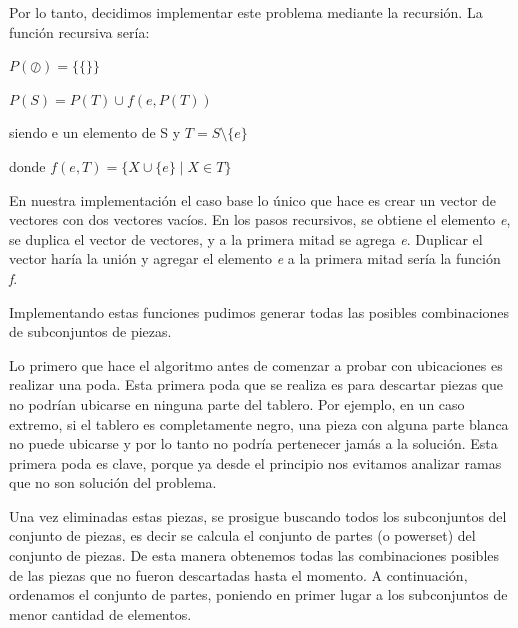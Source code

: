 \quad Por lo tanto, decidimos implementar este problema mediante la recursi\'on. La funci\'on recursiva ser\'ia:

\quad

$ P(\oslash) = \lbrace\lbrace\rbrace\rbrace $

\quad

$ P(S) = P(T) \cup f(e,P(T)) $

\quad

\quad siendo e un elemento de S y $ T = S \setminus \lbrace e \rbrace $

\quad

\quad donde $ f(e,T) = \lbrace X \cup \lbrace e \rbrace \mid X \in T \rbrace $

\quad

\quad En nuestra implementaci\'on el caso base lo \'unico que hace es crear un vector de vectores con dos vectores vac\'ios. En los pasos recursivos, se obtiene el elemento \textit{e}, se duplica el vector de vectores, y a la primera mitad se agrega \textit{e}. Duplicar el vector har\'ia la uni\'on y agregar el elemento \textit{e} a la primera mitad ser\'ia la funci\'on \textit{f}.

\quad Implementando estas funciones pudimos generar todas las posibles combinaciones de subconjuntos de piezas.


\quad Lo primero que hace el algoritmo antes de comenzar a probar con ubicaciones es realizar una poda. Esta primera poda que se realiza es para descartar piezas que no podrían ubicarse en ninguna parte del tablero. Por ejemplo, en un caso extremo, si el tablero es completamente negro, una pieza con alguna parte blanca no puede ubicarse y por lo tanto no podría pertenecer jamás a la solución. Esta primera poda es clave, porque ya desde el principio nos evitamos analizar ramas que no son solución del problema.

\quad Una vez eliminadas estas piezas, se prosigue buscando todos los subconjuntos del conjunto de piezas, es decir se calcula el conjunto de partes (o powerset) del conjunto de piezas. De esta manera obtenemos todas las combinaciones posibles de las piezas que no fueron descartadas hasta el momento. A continuación, ordenamos el conjunto de partes, poniendo en primer lugar a los subconjuntos de menor cantidad de elementos.

